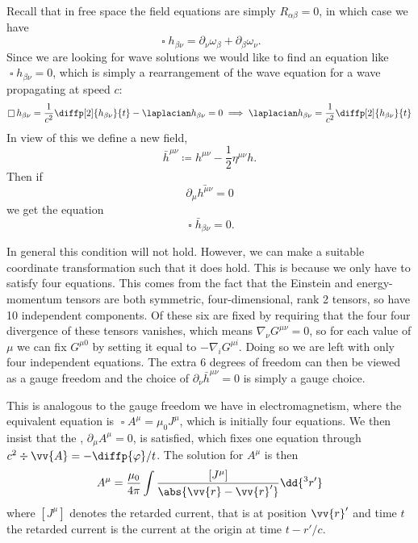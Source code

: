 \documentclass[fleqn]{NotesClass}
\newcommand*{\dalembertian}{\mathop{\square}}
\newcommand*{\covariantDerivative}[1]{\nabla_{\!#1}}
\begin{document}
    Recall that in free space the field equations are simply \(R_{\alpha\beta} = 0\), in which case we have
    \begin{equation}
        \dalembertian h_{\beta\nu} = \partial_\nu \omega_\beta + \partial_\beta \omega_\nu.
    \end{equation}
    Since we are looking for wave solutions we would like to find an equation like \(\dalembertian h_{\beta\nu} = 0\), which is simply a rearrangement of the wave equation for a wave propagating at speed \(c\):
    \begin{equation}
        \dalembertian h_{\beta\nu} = \frac{1}{c^2}\diffp[2]{h_{\beta\nu}}{t} - \laplacian h_{\beta\nu} = 0 \implies \laplacian h_{\beta\nu} = \frac{1}{c^2}\diffp[2]{h_{\beta\nu}}{t}
    \end{equation}
    In view of this we define a new field, 
    \begin{equation}
        \bar{h}^{\mu\nu} \coloneqq h^{\mu\nu} - \frac{1}{2}\eta^{\mu\nu}h.
    \end{equation}
    Then if
    \begin{equation}
        \partial_\mu \bar{h^{\mu\nu}} = 0
    \end{equation}
    we get the equation
    \begin{equation}
        \dalembertian \bar{h}_{\beta\nu} = 0.
    \end{equation}
    
    In general this condition will not hold.
    However, we can make a suitable coordinate transformation such that it does hold.
    This is because we only have to satisfy four equations.
    This comes from the fact that the Einstein and energy-momentum tensors are both symmetric, four-dimensional, rank 2 tensors, so have 10 independent components.
    Of these six are fixed by requiring that the four four divergence of these tensors vanishes, which means \(\covariantDerivative{\nu}G^{\mu\nu} = 0\), so for each value of \(\mu\) we can fix \(G^{\mu 0}\) by setting it equal to \(-\covariantDerivative{i}G^{\mu i}\).
    Doing so we are left with only four independent equations.
    The extra 6 degrees of freedom can then be viewed as a gauge freedom and the choice of \(\partial_\nu\bar{h}^{\mu\nu} = 0\) is simply a gauge choice.
    
    This is analogous to the gauge freedom we have in electromagnetism, where the equivalent equation is \(\dalembertian A^\mu = \mu_0 J^\mu\), which is initially four equations.
    We then insist that the , \(\partial_\mu A^\mu = 0\), is satisfied, which fixes one equation through \(c^2\div\vv{A} = -\diffp{\varphi}/{t}\).
    The solution for \(A^\mu\) is then
    \begin{equation}
        A^\mu = \frac{\mu_0}{4\pi} \int \frac{[J^\mu]}{\abs{\vv{r} - \vv{r}'}} \dd{^3r'}
    \end{equation}
    where \([J^\mu]\) denotes the retarded current, that is at position \(\vv{r}'\) and time \(t\) the retarded current is the current at the origin at time \(t - r'/c\).
    
\end{document}
